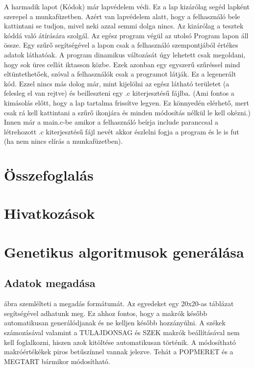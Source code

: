 \documentclass[12pt,a4paper,oneside]{report}
\begin{document}
    A harmadik lapot (Kódok) már lapvédelem védi.
    Ez a lap kizárólag segéd lapként szerepel a munkafüzetben.
    Azért van lapvédelem alatt, hogy a felhasználó bele kattintani se tudjon, mivel neki azzal semmi dolga nincs. Az kizárólag a tesztek kóddá való átírására szolgál.
    Az egész program végül az utolsó Program lapon áll össze.
    Egy szűrő segítségével a lapon csak a felhasználó szempontjából értékes adatok láthatóak.
    A program dinamikus változását úgy lehetett csak megoldani, hogy sok üres cellát iktasson közbe.
    Ezek azonban egy egyszerű szűréssel mind eltüntethetőek, szóval a felhasználók csak a programot látják. Ez a legenerált kód.
    Ezzel nincs más dolog már, mint kijelölni az egész látható területet (a felesleg el van rejtve) és beilleszteni egy .c kiterjesztésű fájlba. (Ami fontos a kimásolás előtt, hogy a lap tartalma frissítve legyen.
    Ez könnyedén elérhető, mert csak rá kell kattintani a szűrő ikonjára és minden módosítás nélkül le kell okézni.)
    Innen már a main.c-be amikor a felhasználó beírja include paranccsal a létrehozott .c kiterjesztésű fájl nevét akkor észlelni fogja a program és le is fut (ha nem nincs elírás a munkafüzetben).

\chapter{Összefoglalás} %

\chapter*{Hivatkozások}




\appendix

\chapter{Genetikus algoritmusok generálása}
\section{Adatok megadása}
 ábra szemlélteti a megadás formátumát. Az egyedeket egy 20x20-as táblázat segítségével adhatunk meg.
Ez ahhoz fontos, hogy a makrók később automatikusan generálódjanak és ne kelljen később hozzányúlni.
A székek számozásával valamint a TULAJDONSAG és SZEK makrók beállításával nem kell foglalkozni, hiszen azok kitöltése automatikusan történik.
A módosítható makróértékékek piros betűszínnel vannak jelezve.
Tehát a POPMERET és a MEGTART bármikor módosítható.
\end{document}
